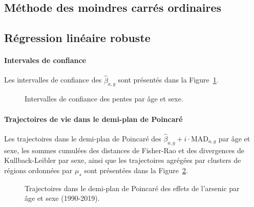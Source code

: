 \subsection{Méthode des moindres carrés ordinaires}

\lipsum[1-3]



\subsection{Régression linéaire robuste}

\paragraph{Intervales de confiance}
Les intervalles de confiance des \(\hat{\beta}_{a,g}\) sont présentés dans la Figure~\ref{fig:CI-arsenic}.
\begin{figure}[H]
	\centering
	\caption{Intervalles de confiance des pentes par âge et sexe.}
	\label{fig:CI-arsenic}
\end{figure}

\paragraph{Trajectoires de vie dans le demi-plan de Poincaré}
Les trajectoires dans le demi-plan de Poincaré des \(\hat{\beta}_{a,g} + i \cdot \mathrm{MAD}_{a,g}\) par âge et sexe, les sommes cumulées des distances de Fisher-Rao et des divergences de Kullback-Leibler par sexe, ainsi que les trajectoires agrégées par clusters de régions ordonnées par \(\mu_s\) sont présentées dans la Figure~\ref{fig:trajectoires-arsenic}.
\begin{figure}[H]
	\centering
	\caption{Trajectoires dans le demi-plan de Poincaré des effets de l'arsenic par âge et sexe (1990-2019).}
	\label{fig:trajectoires-arsenic}
\end{figure}

